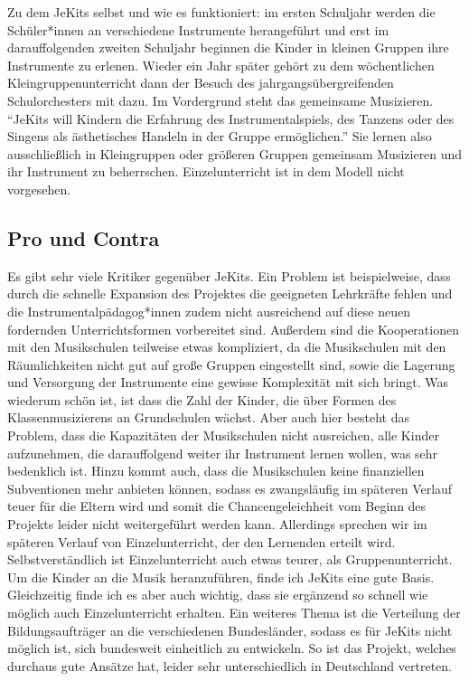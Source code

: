 Zu dem JeKits selbst und wie es funktioniert: im ersten Schuljahr werden die
Schüler*innen an verschiedene Instrumente herangeführt und erst im
darauffolgenden zweiten Schuljahr beginnen die Kinder in kleinen Gruppen ihre
Instrumente zu erlenen. Wieder ein Jahr später gehört zu dem wöchentlichen
Kleingruppenunterricht dann der Besuch des jahrgangsübergreifenden
Schulorchesters mit dazu. Im Vordergrund steht das gemeinsame Musizieren.
\enquote{JeKits will Kindern die Erfahrung des Instrumentalspiels, des Tanzens
oder des Singens als ästhetisches Handeln in der Gruppe ermöglichen.}
\autocite{https://de.wikipedia.org/wiki/JeKits}
Sie lernen also ausschließlich in Kleingruppen oder größeren Gruppen gemeinsam
Musizieren und ihr Instrument zu beherrschen. Einzelunterricht ist in dem Modell
nicht vorgesehen.


\subsection{Pro und Contra}
Es gibt sehr viele Kritiker gegenüber JeKits. Ein Problem ist beispielweise,
dass durch die schnelle Expansion des Projektes die geeigneten Lehrkräfte fehlen
und die Instrumentalpädagog*innen zudem nicht ausreichend auf diese neuen
fordernden Unterrichtsformen vorbereitet sind. Außerdem sind die Kooperationen
mit den Musikschulen teilweise etwas kompliziert, da die Musikschulen mit den
Räumlichkeiten nicht gut auf große Gruppen eingestellt sind, sowie die Lagerung
und Versorgung der Instrumente eine gewisse Komplexität mit sich bringt. Was
wiederum schön ist, ist dass die Zahl der Kinder, die über Formen des
Klassenmusizierens an Grundschulen wächst.
\autocite[119]{ernst:die_zukunftsfaehige_musikschule} Aber auch hier besteht das
Problem, dass die Kapazitäten der Musikschulen nicht ausreichen, alle Kinder
aufzunehmen, die darauffolgend weiter ihr Instrument lernen wollen, was sehr
bedenklich ist. Hinzu kommt auch, dass die Musikschulen keine finanziellen
Subventionen mehr anbieten können, sodass es zwangsläufig im späteren Verlauf
teuer für die Eltern wird und somit die Chancengeleichheit vom Beginn des
Projekts leider nicht weitergeführt werden kann. Allerdings sprechen wir im
späteren Verlauf von Einzelunterricht, der den Lernenden erteilt wird.
Selbstverständlich ist Einzelunterricht auch etwas teurer, als
Gruppenunterricht. Um die Kinder an die Musik heranzuführen, finde ich JeKits
eine gute Basis. Gleichzeitig finde ich es aber auch wichtig, dass sie ergänzend
so schnell wie möglich auch Einzelunterricht erhalten. Ein weiteres Thema ist
die Verteilung der Bildungsaufträger an die verschiedenen Bundesländer, sodass
es für JeKits nicht möglich ist, sich bundesweit einheitlich zu entwickeln. So
ist das Projekt, welches durchaus gute Ansätze hat, leider sehr unterschiedlich
in Deutschland vertreten. 
